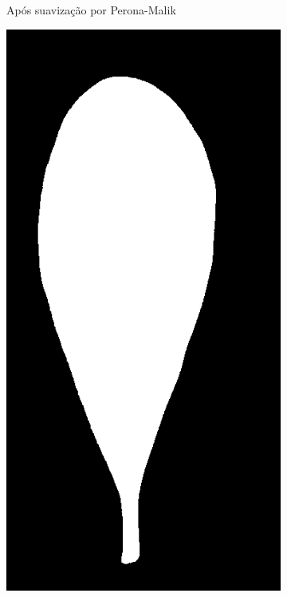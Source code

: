 \begin{figure}[htb]
\begin{subfigure}[t]{0.24\textwidth}
		\caption{Após suavização por Perona-Malik}
	\end{subfigure}
	\begin{subfigure}[t]{0.24\textwidth}
		\centering
		\includegraphics[width=1\textwidth]{img/preprocess.jpg}

\end{subfigure}
\end{figure}
